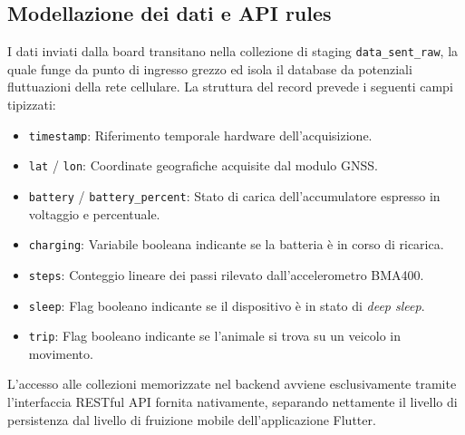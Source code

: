 \documentclass[12pt,a4paper]{article}
\begin{document}
\subsection{Modellazione dei dati e API rules}
I dati inviati dalla board transitano nella collezione di staging \texttt{data\_sent\_raw}, la quale funge da punto di ingresso grezzo ed isola il database da potenziali fluttuazioni della rete cellulare. La struttura del record prevede i seguenti campi tipizzati:
 
\begin{itemize}
    \item \texttt{timestamp}: Riferimento temporale hardware dell'acquisizione.
    \item \texttt{lat} / \texttt{lon}: Coordinate geografiche acquisite dal modulo GNSS.
    \item \texttt{battery} / \texttt{battery\_percent}: Stato di carica dell'accumulatore espresso in voltaggio e percentuale.
    \item \texttt{charging}: Variabile booleana indicante se la batteria è in corso di ricarica.
    \item \texttt{steps}: Conteggio lineare dei passi rilevato dall'accelerometro BMA400.
    \item \texttt{sleep}: Flag booleano indicante se il dispositivo è in stato di \textit{deep sleep}.
    \item \texttt{trip}: Flag booleano indicante se l'animale si trova su un veicolo in movimento.
\end{itemize}
L'accesso alle collezioni memorizzate nel backend avviene esclusivamente tramite l'interfaccia RESTful API fornita nativamente, separando nettamente il livello di persistenza dal livello di fruizione mobile dell'applicazione Flutter. 

\end{document}
